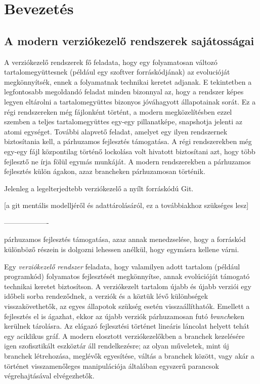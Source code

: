 \documentclass[final]{elteikthesis}[2025/03/25]
\begin{document}
\tableofcontents
\cleardoublepage

\chapter{Bevezetés}

\section{A modern verziókezelő rendszerek sajátosságai}

A verziókezelő rendszerek fő feladata,
hogy egy folyamatosan változó tartalomegyüttesnek (például egy szoftver forráskódjának)
az evolucióját megkönnyítsék, ennek a folyamatnak technikai keretet adjanak.
E tekintetben a legfontosabb megoldandó feladat minden bizonnyal az,
hogy a rendszer képes legyen eltárolni a tartalomegyüttes bizonyos jóváhagyott állapotainak sorát.
Ez a régi rendszereken még fájlonként történt,
a modern megközelítésben ezzel szemben a teljes tartalomegyüttes
egy-egy pillanatképe, snapshotja jelenti az atomi egységet.
További alapvető feladat, amelyet egy ilyen rendszernek biztosítania kell, a párhuzamos fejlesztés támogatása.
A régi rendszerekben még egy-egy fájl központilag történő lockolása volt hivatott biztosítani azt,
hogy több fejlesztő ne írja fölül egymás munkáját.
A modern rendszerekben a párhuzamos fejlesztés külön ágakon, azaz brancheken párhuzamosan történik.

Jelenleg a legelterjedtebb verziókezelő a nyílt forráskódú Git.

[a git mentális modelljéről és adattárolásáról, ez a továbbiakhoz szükséges lesz]

-------------------

párhuzamos fejlesztés támogatása,
azaz annak menedzselése, hogy a forráskód különböző részein is dolgozni lehessen anélkül,
hogy egymásra kellene várni.


Egy \textit{verziókezelő rendszer} feladata, hogy valamilyen adott tartalom (például programkód)
folyamatos fejlesztését megkönnyítse, annak evolúcióját támogató technikai keretet biztosítson.
A verziókezelt tartalom újabb és újabb verziói egy időbeli sorba rendeződnek,
a verziók és a köztük lévő különbségek visszakövethetők,
az egyes állapotok szükség esetén visszaállíthatók.
Emellett a fejlesztés el is ágazhat,
ekkor az újabb verziók párhuzamosan futó \textit{branch}eken kerülnek tárolásra.
Az elágazó fejlesztési történet lineáris láncolat helyett tehát egy aciklikus gráf. 
A modern elosztott verziókezelőkben a branchek kezelésére igen szofisztikált eszköztár áll rendelkezésre;
az olyan műveletek, mint új branchek létrehozása, meglévők egyesítése,
váltás a branchek között,
vagy akár a történet visszamenőleges manipulációja
általában egyszerű parancsok végrehajtásával elvégezhetők.
\end{document}
